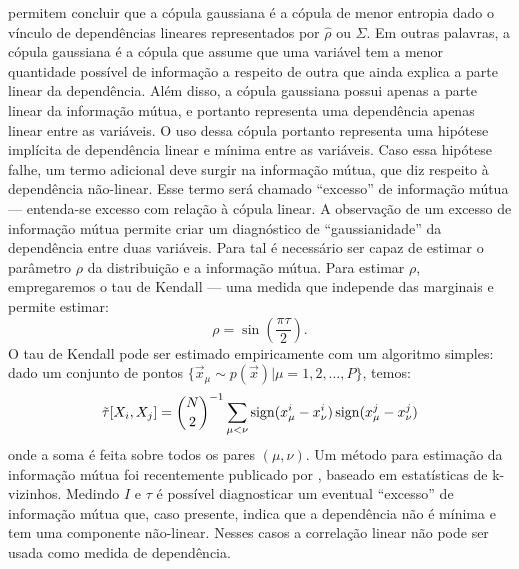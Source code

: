  permitem concluir que a cópula gaussiana é a cópula de menor entropia dado o vínculo de dependências lineares representados por $\hat{\rho}$ ou $\Sigma$. Em outras palavras, a cópula gaussiana é a cópula que assume que uma variável tem a menor quantidade possível de informação a respeito de outra que ainda explica a parte linear da dependência. Além disso, a cópula gaussiana possui apenas a parte linear da informação mútua, e portanto representa uma dependência apenas linear entre as variáveis. O uso dessa cópula portanto representa uma hipótese implícita de dependência linear e mínima entre as variáveis. Caso essa hipótese falhe, um termo adicional deve surgir na informação mútua, que diz respeito à dependência não-linear. Esse termo será chamado ``excesso'' de informação mútua --- entenda-se excesso com relação à cópula linear. A observação de um excesso de informação mútua permite criar um diagnóstico de ``gaussianidade'' da dependência entre duas variáveis. Para tal é necessário ser capaz de estimar o parâmetro $\rho$ da distribuição e a informação mútua. Para estimar $\rho$, empregaremos o tau de Kendall --- uma medida que independe das marginais e permite estimar:
\begin{equation}
 \rho = \sin\left(\frac{\pi\tau}{2}\right).
\end{equation}
O tau de Kendall pode ser estimado empiricamente com um algoritmo simples: dado um conjunto de pontos $\{\vec{x}_\mu \sim p(\vec{x}) | \mu = 1,2,\ldots,P\}$, temos:
\begin{equation}
\label{eq:kendall}
\tilde{\tau}[X_i,X_j] = \binom{N}{2}^{-1} \sum_{\mu < \nu} \sign(x_\mu^i - x_\nu^i)\sign(x_\mu^j - x_\nu^j)
\end{equation}
onde a soma é feita sobre todos os pares $(\mu,\nu)$. Um método para estimação da informação mútua foi recentemente publicado por \citet{Kraskov2004}, baseado em estatísticas de k-vizinhos. Medindo $I$ e $\tau$ é possível diagnosticar um eventual ``excesso'' de informação mútua que, caso presente, indica que a dependência não é mínima e tem uma componente não-linear. Nesses casos a correlação linear não pode ser usada como medida de dependência. 
